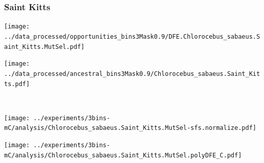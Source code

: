 \subsubsection{Saint Kitts}

\begin{minipage}{0.49\linewidth}
    \texttt{[image: ../data\_processed/opportunities\_bins3Mask0.9/DFE.Chlorocebus\_sabaeus.Saint\_Kitts.MutSel.pdf]}
\end{minipage}
\begin{minipage}{0.49\linewidth}
    \texttt{[image: ../data\_processed/ancestral\_bins3Mask0.9/Chlorocebus\_sabaeus.Saint\_Kitts.pdf]}
\end{minipage}
\\
\begin{minipage}{0.49\linewidth}
    \texttt{[image: ../experiments/3bins-mC/analysis/Chlorocebus\_sabaeus.Saint\_Kitts.MutSel-sfs.normalize.pdf]}
\end{minipage}
\begin{minipage}{0.4\linewidth}
    \texttt{[image: ../experiments/3bins-mC/analysis/Chlorocebus\_sabaeus.Saint\_Kitts.MutSel.polyDFE\_C.pdf]}
\end{minipage}
